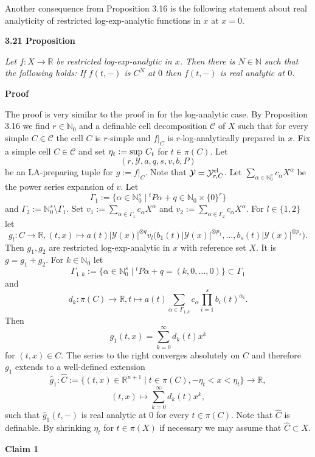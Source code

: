 \documentclass[12pt]{article}
\def\vs{\vspace}
\def\IN{\mathbb N}
\def\IR{\mathbb R}
\def\ma{\mathcal}
\begin{document}
\vs{0.4cm}
Another consequence from Proposition 3.16 is the following statement about real analyticity of restricted log-exp-analytic functions in $x$ at $x=0$.

\vs{0.5cm}
{\bf3.21 Proposition}

\vs{0.1cm}
{\it Let $f:X \to \mathbb{R}$ be restricted log-exp-analytic in $x$. Then there is $N \in \mathbb{N}$ such that the following holds: If $f(t,-)$ is $C^N$ at $0$ then $f(t,-)$ is real analytic at $0$.}

\vs{0.4cm}
{\bf Proof}

\vs{0.1cm}
The proof is very similar to the proof in \cite{7} for the log-analytic case. By Proposition 3.16 we find $r \in \mathbb{N}_0$ and a definable cell decomposition $\mathcal{C}$ of $X$ such that for every simple $C \in \mathcal{C}$ the cell $C$ is $r$-simple and $f|_C$ is $r$-log-analytically prepared in $x$. Fix a simple cell $C \in \mathcal{C}$ and set $\eta_t:=\textnormal{sup }C_t$ for $t \in \pi(C)$. Let 
$$(r,\mathcal{Y},a,q,s,v,b,P)$$
be an LA-preparing tuple for $g:=f|_C$. Note that $\mathcal{Y}=\mathcal{Y}_{r,C}^{\textnormal{el}}$. Let $\sum_{\alpha\in \IN_0^s}c_\alpha X^\alpha$ be the power series expansion of $v$. Let 
$$\Gamma_1:=\big\{\alpha\in \IN_0^s\;\big\vert\;^tP\alpha+q\in \IN_0\times \{0\}^r\big\}$$
and
$\Gamma_2:=\IN_0^s\setminus \Gamma_1.$
Set
$v_1:=\sum_{\alpha\in \Gamma_1}c_\alpha X^\alpha$ and $v_2:=\sum_{\alpha\in \Gamma_2}c_\alpha X^\alpha.$
For $l\in \{1,2\}$ let
$$g_l:C\to \IR, (t,x)\mapsto a(t)|\ma{Y}(x)|^{\otimes q}v_l\big(b_1(t)|\ma{Y}(x)|^{\otimes p_1},\ldots,b_s(t)|\ma{Y}(x)|^{\otimes p_s}\big).$$
Then $g_1,g_2$ are restricted log-exp-analytic in $x$ with reference set $X$. It is $g=g_1+g_2$.
For $k\in \IN_0$ let
$$\Gamma_{1,k}:=\big\{\alpha\in \IN_0^s\;\big\vert\; ^tP\alpha+q=(k,0,\ldots,0)\big\}\subset \Gamma_1$$
and
$$d_k:\pi(C)\to \mathbb{R},t \mapsto
a(t)\sum_{\alpha\in \Gamma_{1,k}}c_\alpha\prod_{i=1}^sb_i(t)^{\alpha_i}.$$
Then
$$g_1(t,x)=\sum_{k=0}^\infty d_k(t)x^k$$
for $(t,x)\in C$.
The series to the right converges absolutely on $C$ and therefore $g_1$ extends to a well-defined extension
$$
\hat{g}_1:\hat{C}:=\big\{(t,x)\in \IR^{n+1}\;\big\vert\; t\in \pi(C), -\eta_t<x<\eta_t \big\}\to \IR,$$
$$(t,x)\mapsto \sum_{k=0}^\infty d_k(t)x^k,$$
such that $\hat{g}_1(t,-)$ is real analytic at $0$ for every $t \in \pi(C)$. Note that $\hat{C}$ is definable. By shrinking $\eta_t$ for $t \in \pi(X)$ if necessary we may assume that $\hat{C} \subset X$.

\vs{0.4cm}
{\bf Claim 1}
\end{document}
